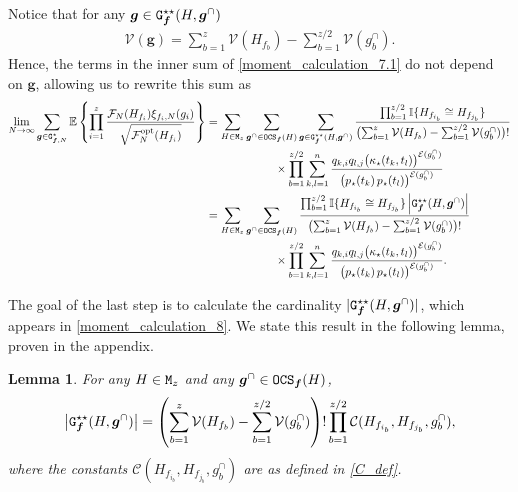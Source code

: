 \documentclass[11pt,reqno]{amsart}
\numberwithin{equation}{section}
\newcommand{\abs}[1]{\left\lvert #1 \right\rvert}
\newcommand{\E}[1]{\mathbb{E}\left\{ #1\right\}}
\newtheorem{lem}[theo]{Lemma}
\newcommand{\kb}[1]{\boldsymbol{#1}}
\newcommand{\vk}[1]{\kb{#1}}
\begin{document}
Notice that for any $\vk g\in {\tt G}^{\star\star}_{\vk f}({H},\vk g^{\cap})$
\begin{align*}
    \mathcal{V}(\vk g) = \sum_{b=1}^{z}\mathcal{V}({H}_{f_b}) - \sum_{b=1}^{z/2}\mathcal{V}(g_b^{\cap}).
\end{align*}
Hence, {the terms in the inner sum of \eqref{moment_calculation_7.1} do not depend on $\vk g$, allowing us to rewrite this sum as} 
\begin{align}
    \lim_{N\to\infty}\sum_{\vk g\in{\tt G}^{\star}_{\vk f,N}}\E{\prod_{i=1}^{z}\frac{\mathcal{F}_{{N}}({H}_{f_i})\xi_{f_i,{N}}(g_i)}{\sqrt{\mathcal{F}^{\rm opt}_N({H}_{f_i})}}}&= \sum_{{H}\in{\tt M}_z}\sum_{\vk g^{\cap}\in{\tt OCS}_{\vk f}({H})}\sum_{\vk g\in{\tt G}^{\star\star}_{\vk f}({H},\vk g^{\cap})}\frac{\prod_{b=1}^{z/2}\mathbb{I}\{{H}_{f_{i_b}}\cong {H}_{f_{j_b}}\}}{\bigl(\sum_{b=1}^{z}\mathcal{V}({H}_{f_b}) - \sum_{b=1}^{z/2}\mathcal{V}(g_b^{\cap})\bigr)!}\notag\\
    &\qquad\qquad\qquad\times\prod_{b=1}^{z/2}\sum_{k,l=1}^{n}\frac{q_{k,i}q_{l,j}\bigl(\kappa_{\star}({t_k,t_l})\bigr)^{\mathcal{E}(g_b^{\cap})}}{\bigl(p_{\star}({t_k})\,p_{\star}({t_l})\bigr)^{\mathcal{E}(g_b^{\cap})}}\notag\\
    &= \sum_{{H}\in{\tt M}_z}\sum_{\vk g^{\cap}\in{\tt OCS}_{\vk f}({H})}\frac{\prod_{b=1}^{z/2}\mathbb{I}\{{H}_{f_{i_b}}\cong {H}_{f_{j_b}}\}\abs{{\tt G}^{\star\star}_{\vk f}({H},\vk g^{\cap})}}{\bigl(\sum_{b=1}^{z}\mathcal{V}({H}_{f_b}) - \sum_{b=1}^{z/2}\mathcal{V}(g_b^{\cap})\bigr)!}\label{moment_calculation_8}\\
    &\qquad\qquad\qquad\times\prod_{b=1}^{z/2}\sum_{k,l=1}^{n}\frac{q_{k,i}q_{l,j}\bigl(\kappa_{\star}({t_k,t_l})\bigr)^{\mathcal{E}(g_b^{\cap})}}{\bigl(p_{\star}({t_k})\,p_{\star}({t_l})\bigr)^{\mathcal{E}(g_b^{\cap})}}.\notag
\end{align}


 {The goal of the last step} is to calculate the cardinality $|{\tt G}^{\star\star}_{\vk f}({H},\vk g^{\cap})|$, {which appears in \eqref{moment_calculation_8}. We state this result in the following lemma, proven in the appendix.}

{\begin{lem}\label{lem:G_star_star_cardinality} For any ${H}\in{\tt M}_z$ and any $\vk g^{\cap}\in{\tt OCS}_{\vk f}({H})$,
    \begin{align*}
        \abs{{\tt G}^{\star\star}_{\vk f}({H},\vk g^{\cap})} = \left(\sum_{b=1}^{z}\mathcal{V}({H}_{f_b}) - \sum_{b=1}^{z/2}\mathcal{V}(g_b^{\cap})\right)!\prod_{b=1}^{z/2}\mathcal{C}({H}_{f_{i_b}},{H}_{f_{j_b}},g^{\cap}_{b}),
    \end{align*}
    where the constants $\mathcal{C}({H}_{f_{i_b}},{H}_{f_{j_b}},g^{\cap}_{b})$ are as defined in \eqref{C_def}.
\end{lem}}
\end{document}
